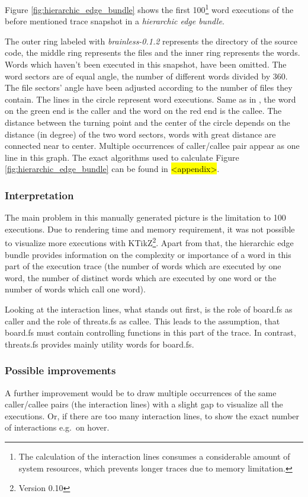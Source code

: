 Figure \ref{fig:hierarchic_edge_bundle} shows the first 100\footnote{The calculation of the interaction lines consumes a considerable amount of system resources, which prevents longer traces due to memory limitation.} word executions of the before mentioned trace snapshot in a \emph{hierarchic edge bundle}.

The outer ring labeled with \emph{brainless-0.1.2} represents the directory of the source code, the middle ring represents the files and the inner ring represents the words. Words which haven't been executed in this snapshot, have been omitted.
The word sectors are of equal angle, the number of different words divided by 360\degree. The file sectors' angle have been adjusted according to the number of files they contain.
The lines in the circle represent word executions. Same as in \cite{Holten:2006:HEB:1187627.1187772}, the word on the green end is the caller and the word on the red end is the callee. The distance between the turning point and the center of the circle depends on the distance (in degree) of the two word sectors, words with great distance are connected near to center. Multiple occurrences of caller/callee pair appear as one line in this graph. The exact algorithms used to calculate Figure \ref{fig:hierarchic_edge_bundle} can be found in \hl{<appendix>}.

\subsubsection*{Interpretation}
The main problem in this manually generated picture is the limitation to  100 executions. Due to rendering time and memory requirement, it was not possible to visualize more executions with KTikZ\footnote{Version 0.10}.
Apart from that, the hierarchic edge bundle provides information on the complexity or importance of a word in this part of the execution trace (the number of words which are executed by one word, the number of distinct words which are executed by one word or the number of words which call one word).

Looking at the interaction lines, what stands out first, is the role of board.fs as caller and the role of threats.fs as callee. This leads to the assumption, that board.fs must contain controlling functions in this part of the trace. In contrast, threats.fs provides mainly utility words for board.fs.

\subsubsection*{Possible improvements}
A further improvement would be to draw multiple occurrences of the same caller/callee pairs (the interaction lines) with a slight gap to visualize all the executions. Or, if there are too many interaction lines, to show the exact number of interactions e.g.\ on hover.


